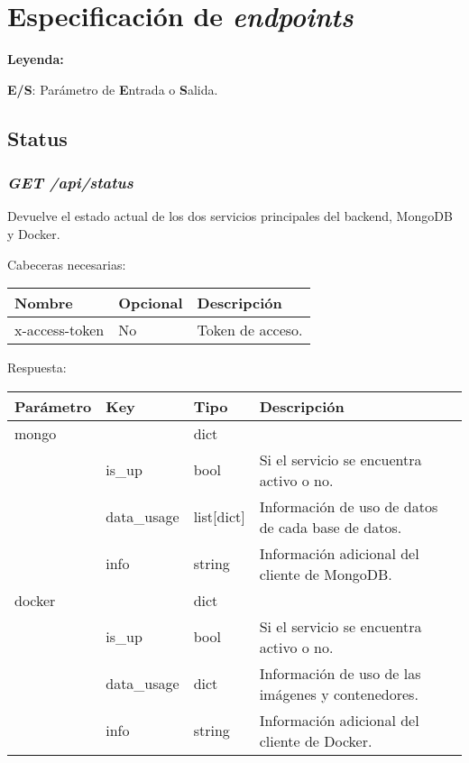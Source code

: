 \chapter{Especificación de \textit{endpoints}}

\textbf{Leyenda:}

\textbf{E/S}: Parámetro de \textbf{E}ntrada o \textbf{S}alida.


\section{Status}

\subsection{\textit{GET /api/status}}
Devuelve el estado actual de los dos servicios principales del backend, MongoDB y Docker.

Cabeceras necesarias:
\begin{table}[h!]
	\centering
	\begin{tabular}{|l|l|l|}
		\hline
		Nombre & Opcional & Descripción \\ \hline
		x-access-token & No & Token de acceso. \\ \hline
	\end{tabular}
\end{table}

Respuesta:
\begin{table}[!h]
	\centering
	\begin{adjustbox}{max width=\textwidth}
	\begin{tabular}{|l|l|l|l|}
		\hline
		Parámetro & Key & Tipo & Descripción \\ \hline
		mongo &  & dict &  \\ \hline
		& is\_up & bool & Si el servicio se encuentra activo o no. \\ \hline
		& data\_usage & list[dict] & Información de uso de datos de cada base de datos. \\ \hline
		& info & string & Información adicional del cliente de MongoDB. \\ \hline
		docker &  & dict &  \\ \hline
		& is\_up & bool & Si el servicio se encuentra activo o no. \\ \hline
		& data\_usage & dict & Información de uso de las imágenes y contenedores. \\ \hline
		& info & string & Información adicional del cliente de Docker. \\ \hline
	\end{tabular}
	\end{adjustbox}
\end{table}

